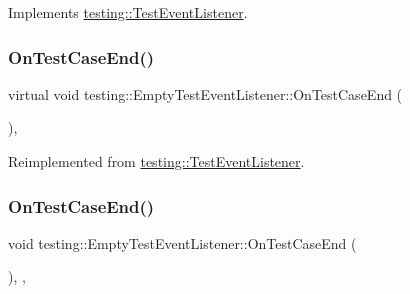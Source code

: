Implements \mbox{\hyperlink{classtesting_1_1_test_event_listener_a468b5e6701bcb86cb2c956caadbba5e4}{testing\+::\+Test\+Event\+Listener}}.

\mbox{\label{classtesting_1_1_empty_test_event_listener_a6bec703158283104c4298f7d8a528515}} 
\subsubsection{\texorpdfstring{OnTestCaseEnd()}{OnTestCaseEnd()}\hspace{0.1cm}{\footnotesize\ttfamily [1/3]}}
{\footnotesize\ttfamily virtual void testing\+::\+Empty\+Test\+Event\+Listener\+::\+On\+Test\+Case\+End (\begin{DoxyParamCaption}\item[{const \mbox{\hyperlink{classtesting_1_1_test_case}{Test\+Case}} \&}]{ }\end{DoxyParamCaption})\hspace{0.3cm}{\ttfamily [inline]}, {\ttfamily [virtual]}}



Reimplemented from \mbox{\hyperlink{classtesting_1_1_test_event_listener_a6cada1572dde8010b94f6dd237ce52f4}{testing\+::\+Test\+Event\+Listener}}.

\mbox{\label{classtesting_1_1_empty_test_event_listener_abe05cc74c1081ed51e2c84b73013299e}} 
\subsubsection{\texorpdfstring{OnTestCaseEnd()}{OnTestCaseEnd()}\hspace{0.1cm}{\footnotesize\ttfamily [2/3]}}
{\footnotesize\ttfamily void testing\+::\+Empty\+Test\+Event\+Listener\+::\+On\+Test\+Case\+End (\begin{DoxyParamCaption}\item[{const \mbox{\hyperlink{classtesting_1_1_test_case}{Test\+Case}} \&}]{ }\end{DoxyParamCaption})\hspace{0.3cm}{\ttfamily [inline]}, {\ttfamily [override]}, {\ttfamily [virtual]}}



